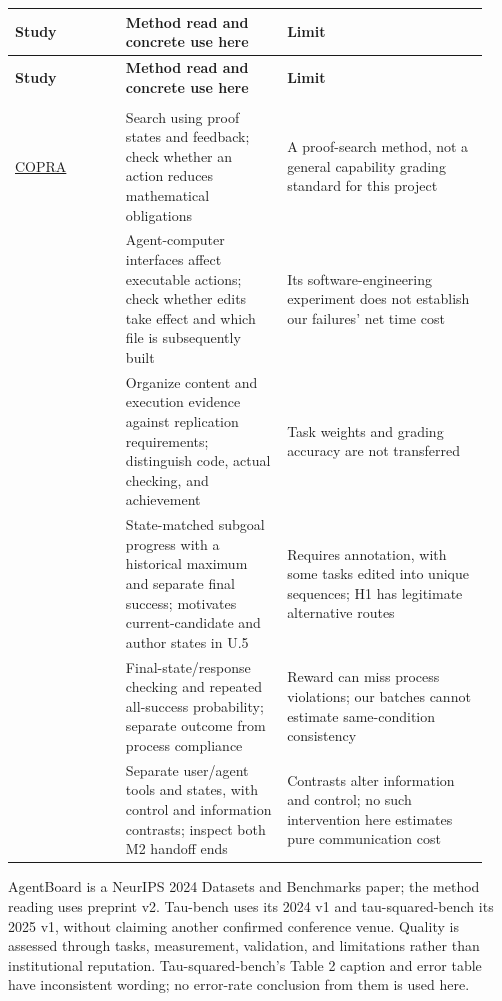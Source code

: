 \begingroup\small\setlength{\tabcolsep}{3pt}\renewcommand{\arraystretch}{1.14}
\begin{longtable}{>{\raggedright\arraybackslash}p{0.22\linewidth}>{\raggedright\arraybackslash}p{0.32\linewidth}>{\raggedright\arraybackslash}p{0.4\linewidth}}
\toprule
\textbf{Study} & \textbf{Method read and concrete use here} & \textbf{Limit}\\\midrule\endfirsthead
\toprule
\textbf{Study} & \textbf{Method read and concrete use here} & \textbf{Limit}\\\midrule\endhead
\midrule\multicolumn{3}{r}{\small Continued on next page}\\\endfoot\bottomrule\endlastfoot
{\href{https://arxiv.org/html/2310.04353v5}{COPRA}} & {Search using proof states and feedback; check whether an action reduces mathematical obligations} & {A proof-search method, not a general capability grading standard for this project}\\
{\href{https://arxiv.org/html/2405.15793v3}{SWE-agent}} & {Agent-computer interfaces affect executable actions; check whether edits take effect and which file is subsequently built} & {Its software-engineering experiment does not establish our failures' net time cost}\\
{\href{https://arxiv.org/html/2504.01848}{PaperBench}} & {Organize content and execution evidence against replication requirements; distinguish code, actual checking, and achievement} & {Task weights and grading accuracy are not transferred}\\
{\href{https://arxiv.org/html/2401.13178v2}{AgentBoard}} & {State-matched subgoal progress with a historical maximum and separate final success; motivates current-candidate and author states in U.5} & {Requires annotation, with some tasks edited into unique sequences; H1 has legitimate alternative routes}\\
{\href{https://arxiv.org/html/2406.12045v1}{tau-bench}} & {Final-state/response checking and repeated all-success probability; separate outcome from process compliance} & {Reward can miss process violations; our batches cannot estimate same-condition consistency}\\
{\href{https://arxiv.org/html/2506.07982v1}{tau-squared-bench}} & {Separate user/agent tools and states, with control and information contrasts; inspect both M2 handoff ends} & {Contrasts alter information and control; no such intervention here estimates pure communication cost}\\
\end{longtable}\endgroup
AgentBoard is a NeurIPS 2024 Datasets and Benchmarks paper; the method reading uses preprint v2. Tau-bench uses its 2024 v1 and tau-squared-bench its 2025 v1, without claiming another confirmed conference venue. Quality is assessed through tasks, measurement, validation, and limitations rather than institutional reputation. Tau-squared-bench's Table 2 caption and error table have inconsistent wording; no error-rate conclusion from them is used here.


